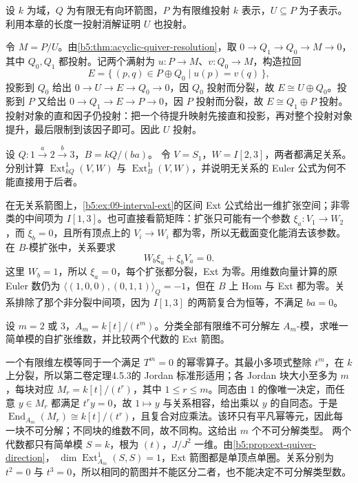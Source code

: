 \begin{exercise}\label{b5:ex:09-submodule-projective}
	设 \(k\) 为域，\(Q\) 为有限无有向环箭图，\(P\) 为有限维投射 \(k\) 表示，\(U\subseteq P\) 为子表示。利用本章的长度一投射消解证明 \(U\) 也投射。
\end{exercise}
\begin{solution}
	令 \(M=P/U\)。由\cref{b5:thm:acyclic-quiver-resolution}，取 \(0\to Q_1\to Q_0\to M\to0\)，其中 \(Q_0,Q_1\) 都投射。记两个满射为 \(u:P\to M\)、\(v:Q_0\to M\)，构造拉回
	\[
		E=\bigl\{\,(p,q)\in P\oplus Q_0\mid u(p)=v(q)\,\bigr\},
	\]
	投影到 \(Q_0\) 给出 \(0\to U\to E\to Q_0\to0\)，因 \(Q_0\) 投射而分裂，故 \(E\cong U\oplus Q_0\)。投影到 \(P\) 又给出 \(0\to Q_1\to E\to P\to0\)，因 \(P\) 投射而分裂，故 \(E\cong Q_1\oplus P\) 投射。投射对象的直和因子仍投射：把一个待提升映射先接直和投影，再对整个投射对象提升，最后限制到该因子即可。因此 \(U\) 投射。
\end{solution}

\begin{exercise}\label{b5:ex:09-relation-kills-extension}
	设 \(Q:1\xrightarrow{a}2\xrightarrow{b}3\)，\(B=kQ/(ba)\)。 令 \(V=S_1\)，\(W=I[2,3]\)，两者都满足关系。 分别计算 \(\operatorname{Ext}_{kQ}^1(V,W)\) 与 \(\operatorname{Ext}_{B}^1(V,W)\)，并说明无关系的 Euler 公式为何不能直接用于后者。
\end{exercise}
\begin{solution}
	在无关系箭图上，\cref{b5:ex:09-interval-ext}的区间 Ext 公式给出一维扩张空间；非零类的中间项为 \(I[1,3]\)。也可直接看箭矩阵：扩张只可能有一个参数 \(\xi_a:V_1\to W_2\)，而 \(\xi_b=0\)，且所有顶点上的 \(V_i\to W_i\) 都为零，所以无截面变化能消去该参数。 在 \(B\)-模扩张中，关系要求
	\[
		W_b\xi_a+\xi_bV_a=0.
	\]
	这里 \(W_b=1\)，所以 \(\xi_a=0\)，每个扩张都分裂，Ext 为零。用维数向量计算的原 Euler 数仍为 \(\bigl\langle(1,0,0),(0,1,1)\bigr\rangle_Q=-1\)，但在 \(B\) 上 Hom 与 Ext 都为零。关系排除了那个非分裂中间项，因为 \(I[1,3]\) 的两箭复合为恒等，不满足 \(ba=0\)。
\end{solution}

\begin{exercise}\label{b5:ex:09-truncated-polynomial-types}
	设 \(m=2\) 或 \(3\)，\(A_m=k[t]/(t^m)\)。分类全部有限维不可分解左 \(A_m\)-模，求唯一简单模的自扩张维数，并比较两个代数的 Ext 箭图。
\end{exercise}
\begin{solution}
	一个有限维左模等同于一个满足 \(T^m=0\) 的幂零算子。其最小多项式整除 \(t^m\)，在 \(k\) 上分裂，所以第二卷定理4.5.3的 Jordan 标准形适用；各 Jordan 块大小至多为 \(m\)，每块对应 \(M_r=k[t]/(t^r)\)，其中 \(1\leq r\leq m\)。同态由 \(1\) 的像唯一决定，而任意 \(y\in M_r\) 都满足 \(t^ry=0\)，故 \(1\mapsto y\) 与关系相容，给出乘以 \(y\) 的自同态。于是 \(\operatorname{End}_{A_m}(M_r)\cong k[t]/(t^r)\)，且复合对应乘法。该环只有平凡幂等元，因此每一块不可分解；不同块的维数不同，故不同构。这给出 \(m\) 个不可分解类型。 两个代数都只有简单模 \(S=k\)，根为 \((t)\)，\(J/J^2\) 一维。由\cref{b5:prop:ext-quiver-direction}， \(\dim\operatorname{Ext}^1_{A_m}(S,S)=1\)，Ext 箭图都是单顶点单圈。关系分别为 \(t^2=0\) 与 \(t^3=0\)，所以相同的箭图并不能区分二者，也不能决定不可分解类型数。
\end{solution}

